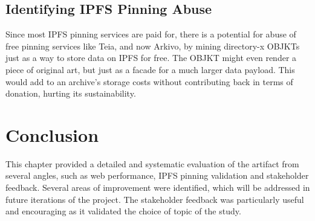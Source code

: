 \subsection{Identifying IPFS Pinning Abuse}

Since most IPFS pinning services are paid for, there is a potential for abuse of free pinning services like Teia, and now Arkivo, by mining directory-x OBJKTs just as a way to store data on IPFS for free. The OBJKT might even render a piece of original art, but just as a facade for a much larger data payload. This would add to an archive's storage costs without contributing back in terms of donation, hurting its sustainability.


\section{Conclusion}

This chapter provided a detailed and systematic evaluation of the artifact from several angles, such as web performance, IPFS pinning validation and stakeholder feedback.
Several areas of improvement were identified, which will be addressed in future iterations of the project. The stakeholder feedback was particularly useful and encouraging as it validated the choice of topic of the study.

